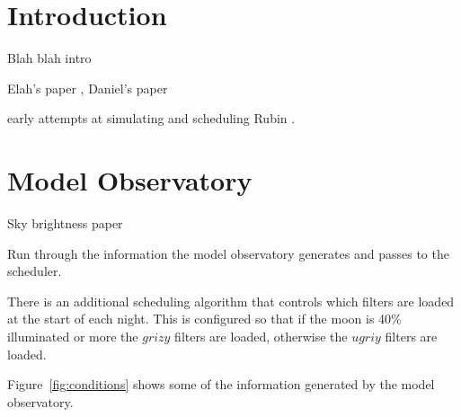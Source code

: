 \documentclass[]{aastex631}
\begin{document}

\section{Introduction} \label{sec:intro}
Blah blah intro

Elah's paper \citet{Naghib2019}, Daniel's paper \citep{Rothchild2019}

early attempts at simulating and scheduling Rubin \citet{Delgado2014, Delgado2016SPIE}.


\section{Model Observatory}\label{sec:model_obs}



Sky brightness paper \citep{Yoachim2016}

Run through the information the model observatory generates and passes to the scheduler.

There is an additional scheduling algorithm that controls which filters are loaded at the start of each night. This is configured so that if the moon is 40\% illuminated or more the $grizy$ filters are loaded, otherwise the $ugriy$ filters are loaded.

Figure~\ref{fig:conditions} shows some of the information generated by the model observatory. 
\end{document}
